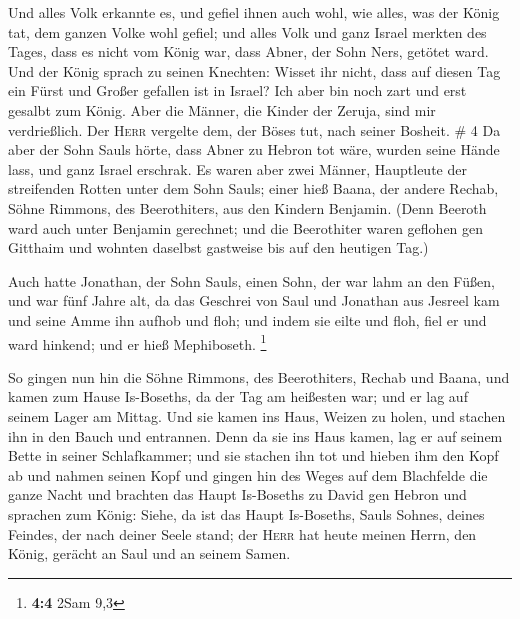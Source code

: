  Und alles Volk erkannte es, und gefiel ihnen auch wohl,
wie alles, was der König tat, dem ganzen Volke wohl gefiel;
 und alles Volk und ganz Israel merkten des Tages, dass
es nicht vom König war, dass Abner, der Sohn Ners, getötet ward.
 Und der König sprach zu seinen Knechten: Wisset ihr
nicht, dass auf diesen Tag ein Fürst und Großer gefallen ist in Israel?
 Ich aber bin noch zart und erst gesalbt zum König. Aber
die Männer, die Kinder der Zeruja, sind mir verdrießlich. Der
\textsc{Herr} vergelte dem, der Böses tut, nach seiner Bosheit. \# 4
 Da aber der Sohn Sauls hörte, dass Abner zu Hebron tot
wäre, wurden seine Hände lass, und ganz Israel erschrak. 
Es waren aber zwei Männer, Hauptleute der streifenden Rotten unter dem
Sohn Sauls; einer hieß Baana, der andere Rechab, Söhne Rimmons, des
Beerothiters, aus den Kindern Benjamin. (Denn Beeroth ward auch unter
Benjamin gerechnet;  und die Beerothiter waren geflohen
gen Gitthaim und wohnten daselbst gastweise bis auf den heutigen Tag.)

 Auch hatte Jonathan, der Sohn Sauls, einen Sohn, der war
lahm an den Füßen, und war fünf Jahre alt, da das Geschrei von Saul und
Jonathan aus Jesreel kam und seine Amme ihn aufhob und floh; und indem
sie eilte und floh, fiel er und ward hinkend; und er hieß Mephiboseth.
\footnote{\textbf{4:4} 2Sam 9,3}

 So gingen nun hin die Söhne Rimmons, des Beerothiters,
Rechab und Baana, und kamen zum Hause Is-Boseths, da der Tag am
heißesten war; und er lag auf seinem Lager am Mittag.  Und
sie kamen ins Haus, Weizen zu holen, und stachen ihn in den Bauch und
entrannen.  Denn da sie ins Haus kamen, lag er auf seinem
Bette in seiner Schlafkammer; und sie stachen ihn tot und hieben ihm den
Kopf ab und nahmen seinen Kopf und gingen hin des Weges auf dem
Blachfelde die ganze Nacht  und brachten das Haupt
Is-Boseths zu David gen Hebron und sprachen zum König: Siehe, da ist das
Haupt Is-Boseths, Sauls Sohnes, deines Feindes, der nach deiner Seele
stand; der \textsc{Herr} hat heute meinen Herrn, den König, gerächt an
Saul und an seinem Samen.

